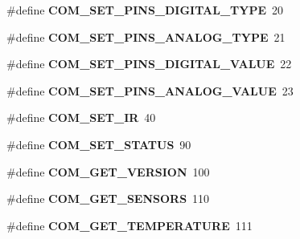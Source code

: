 \begin{DoxyCompactItemize}
\item 
\hypertarget{group___engduino_protocol_ga9ff72fddbd6505a0ab9da20cecf6bdb2}{}\#define {\bfseries C\+O\+M\+\_\+\+S\+E\+T\+\_\+\+P\+I\+N\+S\+\_\+\+D\+I\+G\+I\+T\+A\+L\+\_\+\+T\+Y\+P\+E}~20\label{group___engduino_protocol_ga9ff72fddbd6505a0ab9da20cecf6bdb2}

\item 
\hypertarget{group___engduino_protocol_ga1dadf54abac1cbb21144d1c7c4ec45ba}{}\#define {\bfseries C\+O\+M\+\_\+\+S\+E\+T\+\_\+\+P\+I\+N\+S\+\_\+\+A\+N\+A\+L\+O\+G\+\_\+\+T\+Y\+P\+E}~21\label{group___engduino_protocol_ga1dadf54abac1cbb21144d1c7c4ec45ba}

\item 
\hypertarget{group___engduino_protocol_gad267db0339f4b65aa07fe5e665813c55}{}\#define {\bfseries C\+O\+M\+\_\+\+S\+E\+T\+\_\+\+P\+I\+N\+S\+\_\+\+D\+I\+G\+I\+T\+A\+L\+\_\+\+V\+A\+L\+U\+E}~22\label{group___engduino_protocol_gad267db0339f4b65aa07fe5e665813c55}

\item 
\hypertarget{group___engduino_protocol_gae95eedfb2acad338e2dc493bf91893e9}{}\#define {\bfseries C\+O\+M\+\_\+\+S\+E\+T\+\_\+\+P\+I\+N\+S\+\_\+\+A\+N\+A\+L\+O\+G\+\_\+\+V\+A\+L\+U\+E}~23\label{group___engduino_protocol_gae95eedfb2acad338e2dc493bf91893e9}

\item 
\hypertarget{group___engduino_protocol_ga0c4c40c25683c982cb3091259659d091}{}\#define {\bfseries C\+O\+M\+\_\+\+S\+E\+T\+\_\+\+I\+R}~40\label{group___engduino_protocol_ga0c4c40c25683c982cb3091259659d091}

\item 
\hypertarget{group___engduino_protocol_ga12b42e8896ffd1470d9e2ca085d0f4f2}{}\#define {\bfseries C\+O\+M\+\_\+\+S\+E\+T\+\_\+\+S\+T\+A\+T\+U\+S}~90\label{group___engduino_protocol_ga12b42e8896ffd1470d9e2ca085d0f4f2}

\item 
\hypertarget{group___engduino_protocol_ga7f1cef9d8de3da524d788fc6e009540c}{}\#define {\bfseries C\+O\+M\+\_\+\+G\+E\+T\+\_\+\+V\+E\+R\+S\+I\+O\+N}~100\label{group___engduino_protocol_ga7f1cef9d8de3da524d788fc6e009540c}

\item 
\hypertarget{group___engduino_protocol_ga5f6af6a2b71d8ca4caa93a714b2880f2}{}\#define {\bfseries C\+O\+M\+\_\+\+G\+E\+T\+\_\+\+S\+E\+N\+S\+O\+R\+S}~110\label{group___engduino_protocol_ga5f6af6a2b71d8ca4caa93a714b2880f2}

\item 
\hypertarget{group___engduino_protocol_ga33bb75393ec2321363d229f3cbed2467}{}\#define {\bfseries C\+O\+M\+\_\+\+G\+E\+T\+\_\+\+T\+E\+M\+P\+E\+R\+A\+T\+U\+R\+E}~111\label{group___engduino_protocol_ga33bb75393ec2321363d229f3cbed2467}


\end{DoxyCompactItemize}
